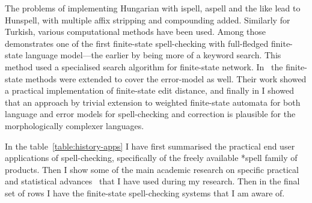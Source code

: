 \documentclass[officiallayout]{unihelcompling}
\begin{document}
The problems of implementing Hungarian with ispell, aspell and the like lead to
Hunspell, with multiple affix stripping and compounding added. Similarly for
Turkish, various computational methods have been used. Among
those~\citet{oflazer1996errortolerant} demonstrates one of the first
finite-state spell-checking with full-fledged finite-state language model---the
earlier by \citep{aho1975efficient} being more of a keyword search. This method
used a specialised search algorithm for finite-state network.
In~\citet{agata2002typographical} the finite-state methods were extended to
cover the error-model as well. Their work showed a practical implementation of
finite-state edit distance, and finally in 
I showed that an approach by trivial extension to weighted finite-state
automata for both language and error models for spell-checking and correction
is plausible for the morphologically complexer languages.


In the table~\ref{table:history-apps} I have first summarised the practical
end user applications of spell-checking, specifically of the freely available
*spell family of products. Then I show some of  the main academic research
on specific practical and statistical advances~\cite{al2006learning} that I
have used during my research. Then in the final set of rows I have the
finite-state spell-checking systems that I am aware of.
\end{document}
